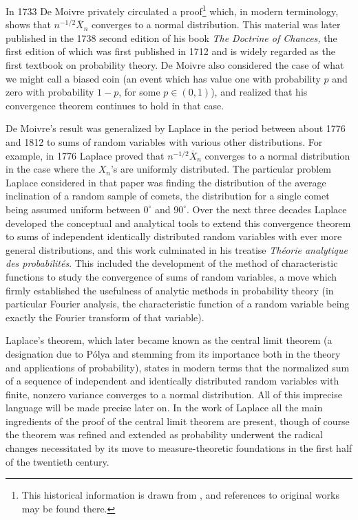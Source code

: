 \documentclass[leqno]{article}
\theoremstyle{definition}
\begin{document}
In 1733 De Moivre privately circulated a proof\footnote{This historical information is drawn from \cite{fischer}, and references to original works may be found there.} which, in modern terminology, shows that $n^{-1/2} \overline X_n$ converges to a normal distribution. This material was later published in the 1738 second edition of his book {\em The Doctrine of Chances,} the first edition of which was first published in 1712 and is widely regarded as the first textbook on probability theory. De Moivre also considered the case of what we might call a biased coin (an event which has value one with probability $p$ and zero with probability $1-p$, for some $p \in (0,1)$), and realized that his convergence theorem continues to hold in that case.

De Moivre's result was generalized by Laplace in the period between about 1776 and 1812 to sums of random variables with various other distributions. For example, in 1776 Laplace proved that $n^{-1/2} \overline X_n$ converges to a normal distribution in the case where the $X_n$'s are uniformly distributed. The particular problem Laplace considered in that paper was finding the distribution of the average inclination of a random sample of comets, the distribution for a single comet being assumed uniform between $0^\circ$ and $90^\circ$. Over the next three decades Laplace developed the conceptual and analytical tools to extend this convergence theorem to sums of independent identically distributed random variables with ever more general distributions, and this work culminated in his treatise {\em Th\'eorie analytique des probabilit\'es}. This included the development of the method of characteristic functions to study the convergence of sums of random variables, a move which firmly established the usefulness of analytic methods in probability theory (in particular Fourier analysis, the characteristic function of a random variable being exactly the Fourier transform of that variable).

Laplace's theorem, which later became known as the central limit theorem (a designation due to P\'olya and stemming from its importance both in the theory and applications of probability), states in modern terms that the normalized sum of a sequence of independent and identically distributed random variables with finite, nonzero variance converges to a normal distribution. All of this imprecise language will be made precise later on. In the work of Laplace all the main ingredients of the proof of the central limit theorem are present, though of course the theorem was refined and extended as probability underwent the radical changes necessitated by its move to measure-theoretic foundations in the first half of the twentieth century.
\end{document}
